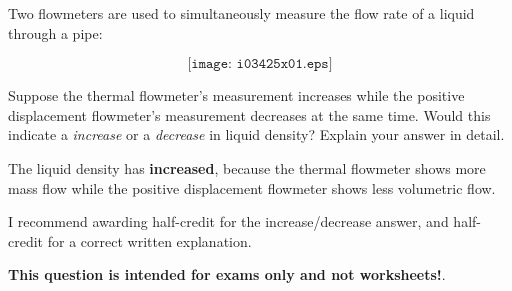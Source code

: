 

Two flowmeters are used to simultaneously measure the flow rate of a liquid through a pipe:

$$\texttt{[image: i03425x01.eps]}$$

Suppose the thermal flowmeter's measurement increases while the positive displacement flowmeter's measurement decreases at the same time.  Would this indicate a {\it increase} or a {\it decrease} in liquid density?  Explain your answer in detail.

\vskip 50pt







The liquid density has {\bf increased}, because the thermal flowmeter shows more mass flow while the positive displacement flowmeter shows less volumetric flow.

\vskip 10pt

I recommend awarding half-credit for the increase/decrease answer, and half-credit for a correct written explanation.







{\bf This question is intended for exams only and not worksheets!}.



